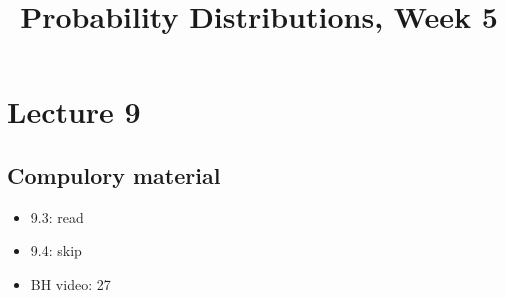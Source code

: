 


\title{Probability Distributions, Week 5}


\maketitle
\toccontents

\section{Lecture 9}
\label{sec:lecture-1}

\subsection{Compulory material}
\label{sec:compulory-material}


\begin{itemize}
\item 9.3: read
\item 9.4: skip
\item BH video: 27
\end{itemize}





